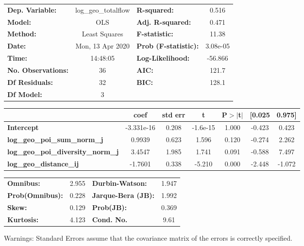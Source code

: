 \begin{center}
\begin{tabular}{lclc}
\toprule
\textbf{Dep. Variable:}                    & log\_geo\_totalflow & \textbf{  R-squared:         } &     0.516   \\
\textbf{Model:}                            &         OLS         & \textbf{  Adj. R-squared:    } &     0.471   \\
\textbf{Method:}                           &    Least Squares    & \textbf{  F-statistic:       } &     11.38   \\
\textbf{Date:}                             &   Mon, 13 Apr 2020  & \textbf{  Prob (F-statistic):} &  3.08e-05   \\
\textbf{Time:}                             &       14:48:05      & \textbf{  Log-Likelihood:    } &   -56.866   \\
\textbf{No. Observations:}                 &            36       & \textbf{  AIC:               } &     121.7   \\
\textbf{Df Residuals:}                     &            32       & \textbf{  BIC:               } &     128.1   \\
\textbf{Df Model:}                         &             3       & \textbf{                     } &             \\
\bottomrule
\end{tabular}
\begin{tabular}{lcccccc}
                                           & \textbf{coef} & \textbf{std err} & \textbf{t} & \textbf{P$> |$t$|$} & \textbf{[0.025} & \textbf{0.975]}  \\
\midrule
\textbf{Intercept}                         &   -3.331e-16  &        0.208     &  -1.6e-15  &         1.000        &       -0.423    &        0.423     \\
\textbf{log\_geo\_poi\_sum\_norm\_j}       &       0.9939  &        0.623     &     1.596  &         0.120        &       -0.274    &        2.262     \\
\textbf{log\_geo\_poi\_diversity\_norm\_j} &       3.4547  &        1.985     &     1.741  &         0.091        &       -0.588    &        7.497     \\
\textbf{log\_geo\_distance\_ij}            &      -1.7601  &        0.338     &    -5.210  &         0.000        &       -2.448    &       -1.072     \\
\bottomrule
\end{tabular}
\begin{tabular}{lclc}
\textbf{Omnibus:}       &  2.955 & \textbf{  Durbin-Watson:     } &    1.947  \\
\textbf{Prob(Omnibus):} &  0.228 & \textbf{  Jarque-Bera (JB):  } &    1.992  \\
\textbf{Skew:}          &  0.129 & \textbf{  Prob(JB):          } &    0.369  \\
\textbf{Kurtosis:}      &  4.123 & \textbf{  Cond. No.          } &     9.61  \\
\bottomrule
\end{tabular}
\end{center}

Warnings: \newline
 [1] Standard Errors assume that the covariance matrix of the errors is correctly specified.